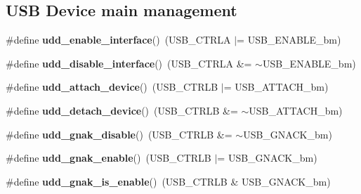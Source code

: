 \subsection*{U\-S\-B Device main management}
\begin{DoxyCompactItemize}
\item 
\hypertarget{group__udd__xmega__usb__group_ga2d97a59a9b0c720c24deffafc256e862}{\#define {\bfseries udd\-\_\-enable\-\_\-interface}()~(U\-S\-B\-\_\-\-C\-T\-R\-L\-A $|$= U\-S\-B\-\_\-\-E\-N\-A\-B\-L\-E\-\_\-bm)}\label{group__udd__xmega__usb__group_ga2d97a59a9b0c720c24deffafc256e862}

\item 
\hypertarget{group__udd__xmega__usb__group_ga0edb39b954b46c1759b992f2170b4ff7}{\#define {\bfseries udd\-\_\-disable\-\_\-interface}()~(U\-S\-B\-\_\-\-C\-T\-R\-L\-A \&= $\sim$U\-S\-B\-\_\-\-E\-N\-A\-B\-L\-E\-\_\-bm)}\label{group__udd__xmega__usb__group_ga0edb39b954b46c1759b992f2170b4ff7}

\item 
\hypertarget{group__udd__xmega__usb__group_ga55686d13fc7b23f4945f527f0dd15906}{\#define {\bfseries udd\-\_\-attach\-\_\-device}()~(U\-S\-B\-\_\-\-C\-T\-R\-L\-B $|$= U\-S\-B\-\_\-\-A\-T\-T\-A\-C\-H\-\_\-bm)}\label{group__udd__xmega__usb__group_ga55686d13fc7b23f4945f527f0dd15906}

\item 
\hypertarget{group__udd__xmega__usb__group_ga1863dacf593fb3c1b5f275b48f1e529a}{\#define {\bfseries udd\-\_\-detach\-\_\-device}()~(U\-S\-B\-\_\-\-C\-T\-R\-L\-B \&= $\sim$U\-S\-B\-\_\-\-A\-T\-T\-A\-C\-H\-\_\-bm)}\label{group__udd__xmega__usb__group_ga1863dacf593fb3c1b5f275b48f1e529a}

\item 
\hypertarget{group__udd__xmega__usb__group_gafd9b1d23a9d6561d70be775bb2244342}{\#define {\bfseries udd\-\_\-gnak\-\_\-disable}()~(U\-S\-B\-\_\-\-C\-T\-R\-L\-B \&= $\sim$U\-S\-B\-\_\-\-G\-N\-A\-C\-K\-\_\-bm)}\label{group__udd__xmega__usb__group_gafd9b1d23a9d6561d70be775bb2244342}

\item 
\hypertarget{group__udd__xmega__usb__group_ga502e1bf0452c51cdaa0bd8549b669dc2}{\#define {\bfseries udd\-\_\-gnak\-\_\-enable}()~(U\-S\-B\-\_\-\-C\-T\-R\-L\-B $|$=  U\-S\-B\-\_\-\-G\-N\-A\-C\-K\-\_\-bm)}\label{group__udd__xmega__usb__group_ga502e1bf0452c51cdaa0bd8549b669dc2}

\item 
\hypertarget{group__udd__xmega__usb__group_ga9b1f90f2b9b1aa15039f1a15ae266f92}{\#define {\bfseries udd\-\_\-gnak\-\_\-is\-\_\-enable}()~(U\-S\-B\-\_\-\-C\-T\-R\-L\-B \& U\-S\-B\-\_\-\-G\-N\-A\-C\-K\-\_\-bm)}\label{group__udd__xmega__usb__group_ga9b1f90f2b9b1aa15039f1a15ae266f92}


\end{DoxyCompactItemize}
